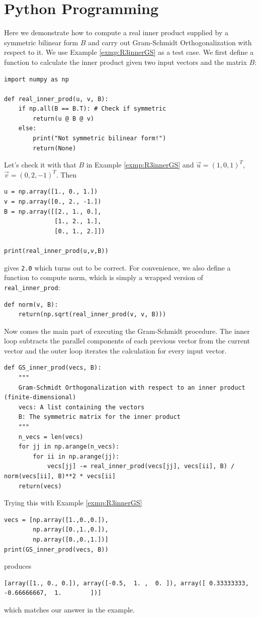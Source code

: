 \section{Python Programming}
Here we demonstrate how to compute a real inner product supplied by a symmetric bilinear form $B$ and carry out Gram-Schmidt Orthogonalization with respect to it. We use Example \ref{exmp:R3innerGS} as a test case. We first define a function to calculate the inner product given two input vectors and the matrix $B$:
\begin{lstlisting}
import numpy as np

def real_inner_prod(u, v, B):
    if np.all(B == B.T): # Check if symmetric
        return(u @ B @ v)
    else:
        print("Not symmetric bilinear form!")
        return(None)
\end{lstlisting}
Let's check it with that $B$ in Example \ref{exmp:R3innerGS} and $\vec{u} = (1,0,1)^T$, $\vec{v} = (0,2,-1)^T$. Then
\begin{lstlisting}
u = np.array([1., 0., 1.])
v = np.array([0., 2., -1.])
B = np.array([[2., 1., 0.],  
              [1., 2., 1.],
              [0., 1., 2.]])

print(real_inner_prod(u,v,B))    
\end{lstlisting}
gives \verb|2.0| which turns out to be correct. For convenience, we also define a function to compute norm, which is simply a wrapped version of \verb|real_inner_prod|:
\begin{lstlisting}
def norm(v, B):
    return(np.sqrt(real_inner_prod(v, v, B)))
\end{lstlisting}
Now comes the main part of executing the Gram-Schmidt procedure. The inner loop subtracts the parallel components of each previous vector from the current vector and the outer loop iterates the calculation for every input vector.
\begin{lstlisting}
def GS_inner_prod(vecs, B):
    """
    Gram-Schmidt Orthogonalization with respect to an inner product (finite-dimensional)
    vecs: A list containing the vectors
    B: The symmetric matrix for the inner product
    """
    n_vecs = len(vecs)
    for jj in np.arange(n_vecs):
        for ii in np.arange(jj):
            vecs[jj] -= real_inner_prod(vecs[jj], vecs[ii], B) / norm(vecs[ii], B)**2 * vecs[ii]
    return(vecs)
\end{lstlisting}
Trying this with Example \ref{exmp:R3innerGS}
\begin{lstlisting}
vecs = [np.array([1.,0.,0.]), 
        np.array([0.,1.,0.]), 
        np.array([0.,0.,1.])]
print(GS_inner_prod(vecs, B))
\end{lstlisting}
produces
\begin{lstlisting}
[array([1., 0., 0.]), array([-0.5,  1. ,  0. ]), array([ 0.33333333, -0.66666667,  1.        ])]    
\end{lstlisting}
which matches our answer in the example.

